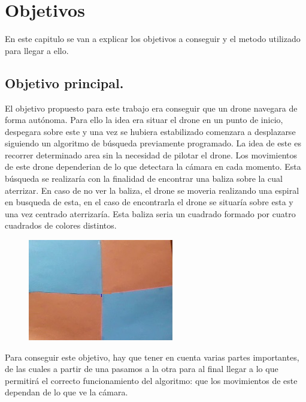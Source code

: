 \chapter{Objetivos}\label{cap.Objetivos}
En este capitulo se van a explicar los objetivos a conseguir y el metodo utilizado para llegar a ello.

\section{Objetivo principal.}
\hspace{1 cm} El objetivo propuesto para este trabajo era conseguir que un drone navegara de forma aut\'onoma. Para ello la idea era situar el drone en un punto de inicio, despegara sobre este y una vez se hubiera estabilizado comenzara a desplazarse siguiendo un algoritmo de b\'usqueda previamente programado. La idea de este es recorrer determinado area sin la necesidad de pilotar el drone. Los movimientos de este drone dependerian de lo que detectara la c\'amara en cada momento. Esta b\'usqueda se realizar\'ia con la finalidad de encontrar una baliza sobre la cual aterrizar. En caso de no ver la baliza, el drone se moveria realizando una espiral en busqueda de esta, en el caso de encontrarla el drone se situar\'ia sobre esta y una vez centrado aterrizar\'ia. Esta baliza seria un cuadrado formado por cuatro cuadrados de colores distintos. 

\begin{figure}[H]
	\centering
		\includegraphics{imgs/baliza.jpg}
	\label{fig:Baliza elegida sobre la que aterrizar. }
\end{figure}

\hspace{1 cm} Para conseguir este objetivo, hay que tener en cuenta varias partes importantes, de las cuales a partir de una pasamos a la otra para al final llegar a lo que permitir\'a el correcto funcionamiento del algoritmo: que los movimientos de este dependan de lo que ve la c\'amara.

